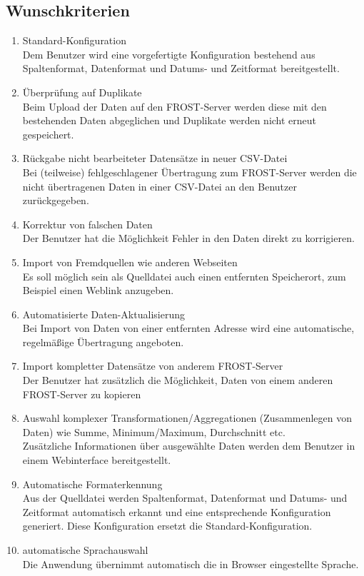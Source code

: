 \documentclass[a4paper, 12 pt]{article}
\begin{document}
	\subsection{Wunschkriterien}
	\begin{enumerate}
	\item Standard-Konfiguration \\
	Dem Benutzer wird eine vorgefertigte Konfiguration bestehend aus Spaltenformat, Datenformat und Datums- und Zeitformat bereitgestellt.
	\item Überprüfung auf Duplikate \\
	Beim Upload der Daten auf den FROST-Server werden diese mit den bestehenden Daten abgeglichen und Duplikate werden nicht erneut gespeichert.
	\item Rückgabe nicht bearbeiteter Datensätze in neuer CSV-Datei \\
	Bei (teilweise) fehlgeschlagener Übertragung zum FROST-Server werden die nicht übertragenen Daten in einer CSV-Datei an den Benutzer zurückgegeben.
	\item Korrektur von falschen Daten \\
	Der Benutzer hat die Möglichkeit Fehler in den Daten direkt zu korrigieren.
	\item Import von Fremdquellen wie anderen Webseiten \\
	Es soll möglich sein als Quelldatei auch einen entfernten Speicherort, zum Beispiel einen Weblink  anzugeben.
	\item Automatisierte Daten-Aktualisierung \\
	Bei Import von Daten von einer entfernten Adresse wird eine automatische, regelmäßige Übertragung angeboten.
	\item Import kompletter Datensätze von anderem FROST-Server \\
	Der Benutzer hat zusätzlich die Möglichkeit, Daten von einem anderen FROST-Server zu kopieren
	\item Auswahl komplexer Transformationen/Aggregationen (Zusammenlegen von Daten) wie Summe, Minimum/Maximum, Durchschnitt etc.\\ 
	Zusätzliche Informationen über ausgewählte Daten werden dem Benutzer in einem Webinterface bereitgestellt.
	\item Automatische Formaterkennung \\
	Aus der Quelldatei werden Spaltenformat, Datenformat und Datums- und Zeitformat automatisch erkannt und eine entsprechende Konfiguration generiert.
	Diese Konfiguration ersetzt die Standard-Konfiguration.
	\item automatische Sprachauswahl \\
	Die Anwendung übernimmt automatisch die in Browser eingestellte Sprache.
	\end{enumerate}
\end{document}
